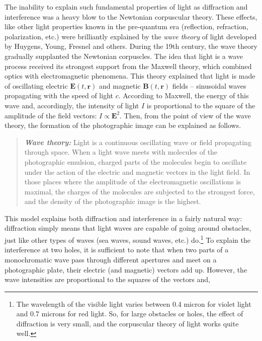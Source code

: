 \documentclass[nochecklpage]{stefan1}
\theoremstyle{definition}
\begin{document}
The inability to explain such fundamental properties of light as
diffraction and interference was a heavy blow to the Newtonian
corpuscular theory. These effects, like other light properties known in
the pre-quantum era (reflection, refraction, polarization, etc.) were
brilliantly explained by the \emph{wave theory} of
light developed by Huygens, Young, Fresnel and others. During the 19th
century, the wave theory gradually supplanted the Newtonian corpuscles.
The idea that light is a wave process received its strongest support
from the Maxwell theory, which combined optics with electromagnetic
phenomena. This theory explained that light is made of oscillating
electric $ \boldsymbol{E}(t, \boldsymbol{r}) $ and magnetic
$ \boldsymbol{B}(t, \boldsymbol{r}) $ fields -- sinusoidal waves
propagating with the speed of light $ c $. According to Maxwell, the
energy of this wave and, accordingly, the intensity of light $ I $ is
proportional to the square of the amplitude of the field vectors:
$ I \propto \boldsymbol{E}^{2} $. Then, from the point of view of the
wave theory, the formation of the photographic image can be explained
as follows.
%
\begin{quote}
\textbf{\textit{Wave theory:}} Light is a continuous oscillating wave or
field propagating through space. When a light wave meets with molecules
of the photographic emulsion, charged parts of the molecules begin to
oscillate under the action of the electric and magnetic vectors in the
light field. In those places where the amplitude of the electromagnetic
oscillations is maximal, the charges of the molecules are subjected to
the strongest force, and the density of the photographic image is the
highest.
\end{quote}
%
This model explains both diffraction and interference in a fairly
natural way: diffraction simply means that light waves are capable of
going around obstacles, just like other types of waves (sea waves, sound
waves, etc.) do.\footnote{The wavelength of the visible light varies
between 0.4 micron for violet light and 0.7 microns for red light. So,
for large obstacles or holes, the effect of diffraction is very small,
and the corpuscular theory of light works quite well.} To explain the
interference at two holes, it is sufficient to note that when two parts
of a monochromatic wave pass through different apertures and meet on a photographic
plate, their electric (and magnetic) vectors add up. However, the wave
intensities are proportional to the squares of the vectors and,
\end{document}
